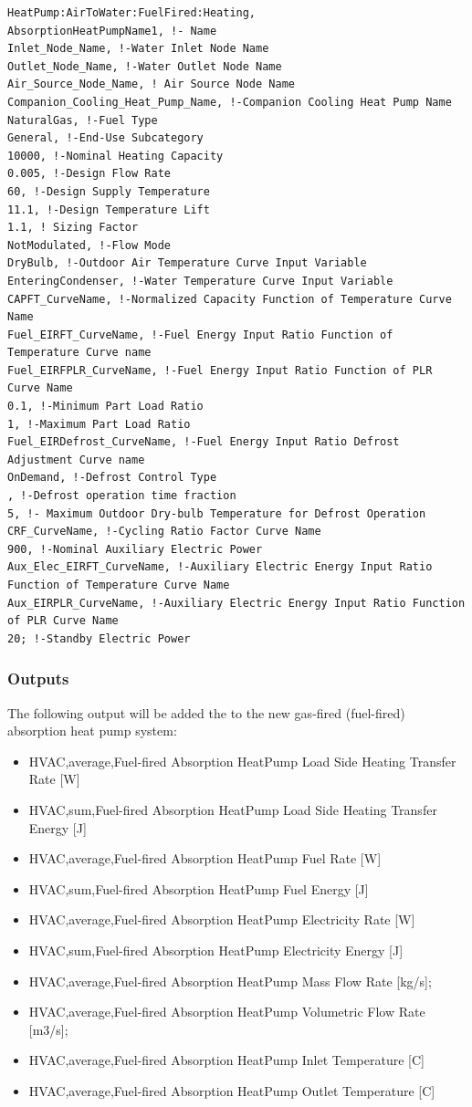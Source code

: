 \begin{lstlisting}
HeatPump:AirToWater:FuelFired:Heating,
AbsorptionHeatPumpName1, !- Name
Inlet_Node_Name, !-Water Inlet Node Name
Outlet_Node_Name, !-Water Outlet Node Name
Air_Source_Node_Name, ! Air Source Node Name
Companion_Cooling_Heat_Pump_Name, !-Companion Cooling Heat Pump Name
NaturalGas, !-Fuel Type
General, !-End-Use Subcategory
10000, !-Nominal Heating Capacity
0.005, !-Design Flow Rate
60, !-Design Supply Temperature
11.1, !-Design Temperature Lift
1.1, ! Sizing Factor
NotModulated, !-Flow Mode
DryBulb, !-Outdoor Air Temperature Curve Input Variable
EnteringCondenser, !-Water Temperature Curve Input Variable
CAPFT_CurveName, !-Normalized Capacity Function of Temperature Curve Name
Fuel_EIRFT_CurveName, !-Fuel Energy Input Ratio Function of Temperature Curve name
Fuel_EIRFPLR_CurveName, !-Fuel Energy Input Ratio Function of PLR Curve Name
0.1, !-Minimum Part Load Ratio
1, !-Maximum Part Load Ratio
Fuel_EIRDefrost_CurveName, !-Fuel Energy Input Ratio Defrost Adjustment Curve name
OnDemand, !-Defrost Control Type
, !-Defrost operation time fraction
5, !- Maximum Outdoor Dry-bulb Temperature for Defrost Operation
CRF_CurveName, !-Cycling Ratio Factor Curve Name
900, !-Nominal Auxiliary Electric Power
Aux_Elec_EIRFT_CurveName, !-Auxiliary Electric Energy Input Ratio Function of Temperature Curve Name
Aux_EIRPLR_CurveName, !-Auxiliary Electric Energy Input Ratio Function of PLR Curve Name
20; !-Standby Electric Power
\end{lstlisting}

\subsubsection{Outputs}

The following output will be added the to the new gas-fired (fuel-fired) absorption heat pump system: 

\begin{itemize}
\item HVAC,average,Fuel-fired Absorption HeatPump Load Side Heating Transfer Rate [W]
\item HVAC,sum,Fuel-fired Absorption HeatPump Load Side Heating Transfer Energy [J]
\item HVAC,average,Fuel-fired Absorption HeatPump Fuel Rate [W]
\item HVAC,sum,Fuel-fired Absorption HeatPump Fuel Energy [J]
\item HVAC,average,Fuel-fired Absorption HeatPump Electricity Rate [W]
\item HVAC,sum,Fuel-fired Absorption HeatPump Electricity Energy [J]
\item HVAC,average,Fuel-fired Absorption HeatPump Mass Flow Rate [kg/s];
\item HVAC,average,Fuel-fired Absorption HeatPump Volumetric Flow Rate [m3/s];
\item HVAC,average,Fuel-fired Absorption HeatPump Inlet Temperature [C]
\item HVAC,average,Fuel-fired Absorption HeatPump Outlet Temperature [C]
\end{itemize}

